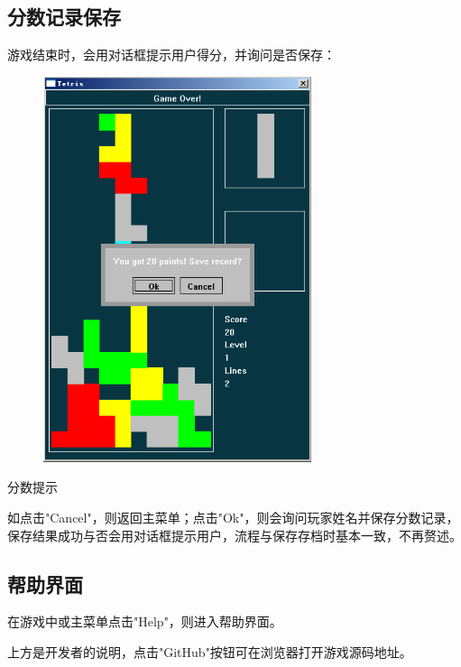 \documentclass{style/ucasproposal}
\begin{document}
\subsection{分数记录保存}
游戏结束时，会用对话框提示用户得分，并询问是否保存：
\begin{center}
\begin{figure}[H]
\center
    \includegraphics[width=0.7\textwidth]{./img/manual/13-record-save.png}
\end{figure}
分数提示
\end{center}

如点击"Cancel"，则返回主菜单；点击"Ok"，则会询问玩家姓名并保存分数记录，
保存结果成功与否会用对话框提示用户，流程与保存存档时基本一致，不再赘述。

\subsection{帮助界面}
在游戏中或主菜单点击"Help"，则进入帮助界面。

上方是开发者的说明，点击"GitHub"按钮可在浏览器打开游戏源码地址。
\end{document}
